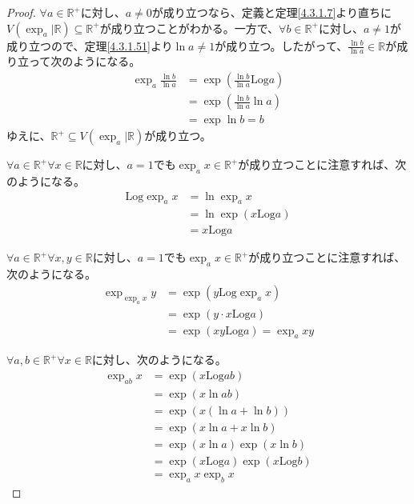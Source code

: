 \documentclass[dvipdfmx]{jsarticle}
\begin{document}
\begin{proof}
$\forall a \in \mathbb{R}^{+}$に対し、$a \neq 0$が成り立つなら、定義と定理\ref{4.3.1.7}より直ちに$V\left( \exp_{a}|\mathbb{R} \right) \subseteq \mathbb{R}^{+}$が成り立つことがわかる。一方で、$\forall b \in \mathbb{R}^{+}$に対し、$a \neq 1$が成り立つので、定理\ref{4.3.1.51}より$\ln a \neq 1$が成り立つ。したがって、$\frac{\ln b}{\ln a} \in \mathbb{R}$が成り立って次のようになる。
\begin{align*}
\exp_{a}\frac{\ln b}{\ln a} &= \exp\left( \frac{\ln b}{\ln a}\mathrm{Log}a \right)\\
&= \exp\left( \frac{\ln b}{\ln a}\ln a \right)\\
&= \exp{\ln b} = b
\end{align*}
ゆえに、$\mathbb{R}^{+} \subseteq V\left( \exp_{a}|\mathbb{R} \right)$が成り立つ。\par
$\forall a \in \mathbb{R}^{+}\forall x \in \mathbb{R}$に対し、$a = 1$でも$\exp_{a}x \in \mathbb{R}^{+}$が成り立つことに注意すれば、次のようになる。
\begin{align*}
\mathrm{Log}{\exp_{a}x} &= \ln{\exp_{a}x}\\
&= \ln{\exp\left( x\mathrm{Log}a \right)}\\
&= x\mathrm{Log}a
\end{align*}\par
$\forall a \in \mathbb{R}^{+}\forall x,y \in \mathbb{R}$に対し、$a = 1$でも$\exp_{a}x \in \mathbb{R}^{+}$が成り立つことに注意すれば、次のようになる。
\begin{align*}
\exp_{\exp_{a}x}y &= \exp\left( y\mathrm{Log}{\exp_{a}x} \right)\\
&= \exp\left( y \cdot x\mathrm{Log}a \right)\\
&= \exp\left( xy\mathrm{Log}a \right) = \exp_{a}{xy}
\end{align*}\par
$\forall a,b \in \mathbb{R}^{+}\forall x \in \mathbb{R}$に対し、次のようになる。
\begin{align*}
\exp_{ab}x &= \exp\left( x\mathrm{Log}{ab} \right)\\
&= \exp\left( x\ln{ab} \right)\\
&= \exp\left( x\left( \ln a + \ln b \right) \right)\\
&= \exp\left( x\ln a + x\ln b \right)\\
&= \exp\left( x\ln a \right)\exp\left( x\ln b \right)\\
&= \exp\left( x\mathrm{Log}a \right)\exp\left( x\mathrm{Log}b \right)\\
&= \exp_{a}x\exp_{b}x
\end{align*}
\end{proof}
\end{document}
